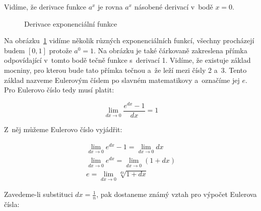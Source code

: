 Vidíme, že derivace funkce \(a^x\) je rovna \(a^x\) násobené derivací v~bodě \(x = 0\).

\begin{figure}
\begin{center}
\caption{Derivace exponenciální funkce}
\end{center}
\label{img:derivace_exponencialni_funkce}
\end{figure}

Na obrázku~\ref{img:derivace_exponencialni_funkce} vidíme několik různých exponenciálních funkcí, všechny procházejí budem \([0, 1]\) protože \(a^0 = 1\). Na obrázku je také čárkovaně zakreslena přímka odpovídající v~tomto bodě tečně funkce s~derivací 1. Vidíme, že existuje základ mocniny, pro kterou bude tato přímka tečnou a~že leží mezi čísly 2 a~3. Tento základ nazveme Eulerovým číslem po slavném matematikovy a~označíme jej \(e\). Pro Eulerovo číslo tedy musí platit:

\begin{equation}
\lim_{dx \to 0} \frac{e^{dx} - 1}{dx} = 1
\end{equation}

Z~něj můžeme Eulerovo číslo vyjádřit:

\begin{equation}
\begin{split}
\lim_{dx \to 0} e^{dx} - 1 = \lim_{dx \to 0} dx \\
\lim_{dx \to 0} e^{dx} = \lim_{dx \to 0} (1 + dx) \\
e = \lim_{dx \to 0} \sqrt[dx]{1 + dx}
\end{split}
\end{equation}

Zavedeme-li substituci \(dx = \frac{1}{n}\), pak dostaneme známý vztah pro výpočet Eulerova čísla:

